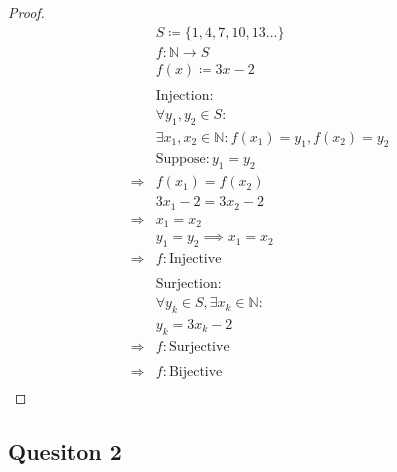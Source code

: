 \documentclass{article}
\begin{document}
\begin{proof}
    \begin{align*}
        &S\coloneqq \{1,4,7,10,13...\}\\
        &f:\mathbb{N} \rightarrow S\\
        &f(x)\coloneqq 3x-2\\
        &\\
        &\text{Injection}:\\
        &\forall y_1,y_2\in S:\\
        &\exists x_1,x_2\in \mathbb{N} :f(x_1)=y_1,f(x_2)=y_2\\
        &\text{Suppose}:y_1=y_2\\
        \Rightarrow&f(x_1)=f(x_2)\\
        &3x_1-2=3x_2-2\\
        \Rightarrow&x_1=x_2\\
        &y_1=y_2\implies x_1=x_2\\
        \Rightarrow&f:\text{Injective}\\
        &\\
        &\text{Surjection}:\\
        &\forall y_k\in S,\exists x_k\in \mathbb{N} :\\
        &y_k=3x_k-2\\
        \Rightarrow&f:\text{Surjective}\\
        &\\
        \Rightarrow&f:\text{Bijective}\\
    \end{align*}
\end{proof}

\newpage

\subsection*{Quesiton 2}

~
\end{document}
